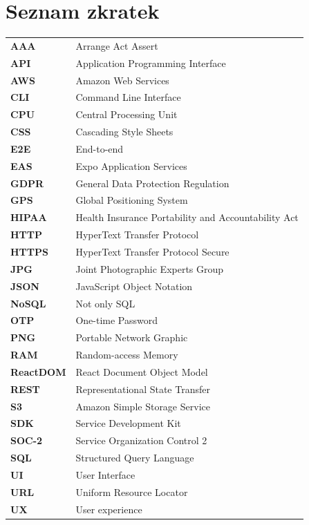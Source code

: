 \documentclass[czech, bp, kiv, he, iso690numb, pdf]{fasthesis}
\begin{document}
    \printbibliography

    \chapter*{Seznam zkratek}

    \begin{tabular}{ll}
        \textbf{AAA} & Arrange Act Assert \\
        \textbf{API} & Application Programming Interface \\
        \textbf{AWS} & Amazon Web Services \\
        \textbf{CLI} & Command Line Interface \\
        \textbf{CPU} & Central Processing Unit \\
        \textbf{CSS} & Cascading Style Sheets \\
        \textbf{E2E} & End-to-end \\
        \textbf{EAS} & Expo Application Services \\
        \textbf{GDPR} & General Data Protection Regulation \\
        \textbf{GPS} & Global Positioning System \\
        \textbf{HIPAA} & Health Insurance Portability and Accountability Act \\
        \textbf{HTTP} & HyperText Transfer Protocol \\
        \textbf{HTTPS} & HyperText Transfer Protocol Secure \\
        \textbf{JPG} & Joint Photographic Experts Group \\
        \textbf{JSON} & JavaScript Object Notation \\
        \textbf{NoSQL} & Not only SQL \\
        \textbf{OTP} & One-time Password \\
        \textbf{PNG} & Portable Network Graphic \\
        \textbf{RAM} & Random-access Memory \\
        \textbf{ReactDOM} & React Document Object Model \\
        \textbf{REST} & Representational State Transfer \\
        \textbf{S3} & Amazon Simple Storage Service \\
        \textbf{SDK} & Service Development Kit \\
        \textbf{SOC-2} & Service Organization Control 2 \\
        \textbf{SQL} & Structured Query Language \\
        \textbf{UI} & User Interface \\
        \textbf{URL} & Uniform Resource Locator \\
        \textbf{UX} & User experience \\
    \end{tabular}

    \listoffigures
    \listoftables

    \backmatter
    \setbackpageqrcode
    \backpage
\end{document}
